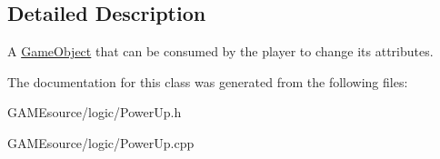 \subsection{Detailed Description}
A \mbox{\hyperlink{class_game_object}{Game\+Object}} that can be consumed by the player to change its attributes. 

The documentation for this class was generated from the following files\+:\begin{DoxyCompactItemize}
\item 
G\+A\+M\+Esource/logic/Power\+Up.\+h\item 
G\+A\+M\+Esource/logic/Power\+Up.\+cpp\end{DoxyCompactItemize}
